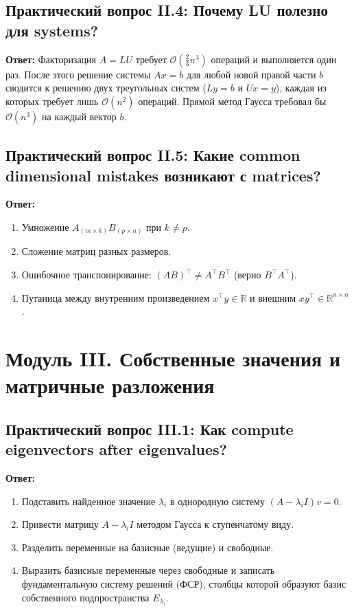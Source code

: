 \subsection{Практический вопрос II.4: Почему LU полезно для systems?}
\textbf{Ответ:} Факторизация $A = LU$ требует $\mathcal{O}\left(\frac{2}{3} n^3\right)$ операций и выполняется один раз.
После этого решение системы $Ax = b$ для любой новой правой части $b$ сводится к решению двух треугольных систем ($Ly =
b$ и $Ux = y$), каждая из которых требует лишь $\mathcal{O}(n^2)$ операций.
Прямой метод Гаусса требовал бы $\mathcal{O}(n^3)$ на каждый вектор $b$.

\subsection{Практический вопрос II.5: Какие common dimensional mistakes возникают с matrices?}
\textbf{Ответ:}
\begin{enumerate}
    \item Умножение $A_{(m \times k)} B_{(p \times n)}$ при $k \ne p$.
    \item Сложение матриц разных размеров.
    \item Ошибочное транспонирование: $(AB)^\top \ne A^\top B^\top$ (верно $B^\top A^\top$).
    \item Путаница между внутренним произведением $x^\top y\in\mathbb{R}$ и внешним
    $x y^\top \in\mathbb{R}^{n \times n}$.
\end{enumerate}

\newpage

\section{Модуль III. Собственные значения и матричные разложения}

\subsection{Практический вопрос III.1: Как compute eigenvectors after eigenvalues?}
\textbf{Ответ:}
\begin{enumerate}
    \item Подставить найденное значение $\lambda_i$ в однородную систему $(A - \lambda_i I) v = 0$.
    \item Привести матрицу $A - \lambda_i I$ методом Гаусса к ступенчатому виду.
    \item Разделить переменные на базисные (ведущие) и свободные.
    \item Выразить базисные переменные через свободные и записать фундаментальную систему решений (ФСР), столбцы
    которой образуют базис собственного подпространства $E_{\lambda_i}$.
\end{enumerate}

